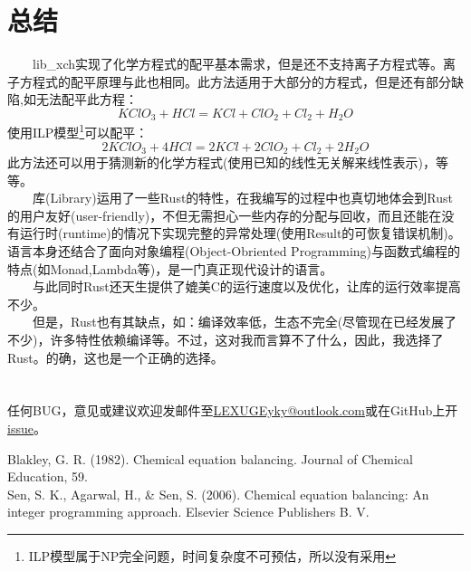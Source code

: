 \documentclass[1pt]{article}
\begin{document}
  \section{总结}
  　　lib\_xch实现了化学方程式的配平基本需求，但是还不支持离子方程式等。离子方程式的配平原理与此也相同。此方法适用于大部分的方程式，但是还有部分缺陷,如无法配平此方程：\\
  \begin{equation}
    KClO_{3}+HCl=KCl+ClO_{2}+Cl_{2}+H_{2}O
  \end{equation}
  使用ILP模型\footnote{ILP模型属于NP完全问题，时间复杂度不可预估，所以没有采用}可以配平：\\
  \begin{equation}
    2KClO_{3}+4HCl=2KCl+2ClO_{2}+Cl_{2}+2H_{2}O
  \end{equation}
  此方法还可以用于猜测新的化学方程式(使用已知的线性无关解来线性表示)，等等。\\
  　　库(Library)运用了一些Rust的特性，在我编写的过程中也真切地体会到Rust的用户友好(user-friendly)，不但无需担心一些内存的分配与回收，而且还能在没有运行时(runtime)的情况下实现完整的异常处理(使用Result的可恢复错误机制)。语言本身还结合了面向对象编程(Object-Obriented Programming)与函数式编程的特点(如Monad,Lambda等)，是一门真正现代设计的语言。\\
  　　与此同时Rust还天生提供了媲美C的运行速度以及优化，让库的运行效率提高不少。\\
  　　但是，Rust也有其缺点，如：编译效率低，生态不完全(尽管现在已经发展了不少)，许多特性依赖编译等。不过，这对我而言算不了什么，因此，我选择了Rust。的确，这也是一个正确的选择。\\
  \\
  \\
  任何BUG，意见或建议欢迎发邮件至\href{mailto:LEXUGEyky@outlook.com}{LEXUGEyky@outlook.com}或在GitHub上开\href{https://github.com/LEXUGE/lib-xch-ceb/issues}{issue}。

  \newpage
  \begin{thebibliography}{1}
   Blakley, G. R. (1982). Chemical equation balancing. Journal of Chemical Education, 59.\\
   Sen, S. K., Agarwal, H., \& Sen, S. (2006). Chemical equation balancing: An integer programming approach. Elsevier Science Publishers B. V.\\
  \end{thebibliography}
\end{document}
